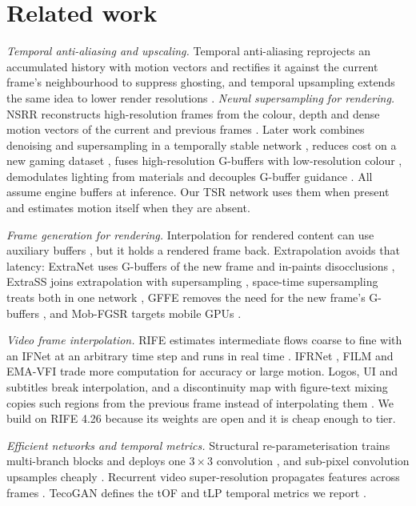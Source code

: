 \documentclass[pdflatex,sn-mathphys-num,iicol]{sn-jnl}
\begin{document}
\section{Related work}\label{sec:related}

\emph{Temporal anti-aliasing and upscaling.} Temporal anti-aliasing reprojects an accumulated history with motion vectors and rectifies it against the current frame's neighbourhood to suppress ghosting, and temporal upsampling extends the same idea to lower render resolutions \cite{yang2020taasurvey}.
\emph{Neural supersampling for rendering.} NSRR reconstructs high-resolution frames from the colour, depth and dense motion vectors of the current and previous frames \cite{xiao2020nsrr}. Later work combines denoising and supersampling in a temporally stable network \cite{thomas2022denoise}, reduces cost on a new gaming dataset \cite{mercier2023qrisp}, fuses high-resolution G-buffers with low-resolution colour \cite{zhong2023fusesr}, demodulates lighting from materials \cite{li2024demodulation} and decouples G-buffer guidance \cite{zheng2025rdg}. All assume engine buffers at inference. Our TSR network uses them when present and estimates motion itself when they are absent.

\emph{Frame generation for rendering.} Interpolation for rendered content can use auxiliary buffers \cite{briedis2021rendered}, but it holds a rendered frame back. Extrapolation avoids that latency: ExtraNet uses G-buffers of the new frame and in-paints disocclusions \cite{guo2021extranet}, ExtraSS joins extrapolation with supersampling \cite{wu2023extrass}, space-time supersampling treats both in one network \cite{he2024stss}, GFFE removes the need for the new frame's G-buffers \cite{wu2024gffe}, and Mob-FGSR targets mobile GPUs \cite{yang2024mobfgsr}.

\emph{Video frame interpolation.} RIFE estimates intermediate flows coarse to fine with an IFNet at an arbitrary time step and runs in real time \cite{huang2022rife}. IFRNet \cite{kong2022ifrnet}, FILM \cite{reda2022film} and EMA-VFI \cite{zhang2023emavfi} trade more computation for accuracy or large motion. Logos, UI and subtitles break interpolation, and a discontinuity map with figure-text mixing copies such regions from the previous frame instead of interpolating them \cite{lee2023discontinuity}. We build on RIFE 4.26 because its weights are open and it is cheap enough to tier.

\emph{Efficient networks and temporal metrics.} Structural re-parameterisation trains multi-branch blocks and deploys one $3\times3$ convolution \cite{ding2021repvgg,zhang2021ecbsr}, and sub-pixel convolution upsamples cheaply \cite{shi2016espcn}. Recurrent video super-resolution propagates features across frames \cite{chan2022basicvsrpp}. TecoGAN defines the tOF and tLP temporal metrics we report \cite{chu2020tecogan}.
\end{document}
